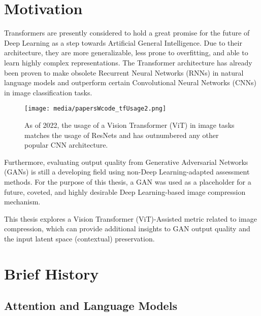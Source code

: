 
\section{Motivation}

Transformers are presently considered to hold a great promise for the future of Deep Learning
as a step towards Artificial General Intelligence.
Due to their architecture, they are more generalizable, less prone to overfitting, and able 
to learn highly complex representations. The Transformer architecture has already been proven 
to make obsolete Recurrent Neural Networks (RNNs) in natural language models and outperform
certain Convolutional Neural Networks (CNNs) in image classification tasks. \citep{dosovitskiy2020vit}


\begin{figure}[H]
	\begin{center}
	\texttt{[image: media/papersWcode\_tfUsage2.png]}
	\end{center}
	\caption[Historical Usage of ViT in Image Tasks]{As of 2022, the usage of a Vision Transformer (ViT) in image 
	tasks matches the usage of ResNets and has outnumbered any other popular CNN architecture.
	\citep{PapersOverTime}}
	\end{figure}

Furthermore, evaluating output quality from Generative Adversarial Networks (GANs) is 
still a developing field using non-Deep Learning-adapted assessment methods. 
For the purpose of this thesis, a GAN was used as a placeholder 
for a future, coveted, and highly desirable Deep Learning-based image compression mechanism. 


This thesis explores a Vision Transformer (ViT)-Assisted metric related to 
image compression, which can provide 
additional insights to GAN output quality and the input latent space (contextual) preservation.




\section{Brief History}

\subsection{Attention and Language Models}

